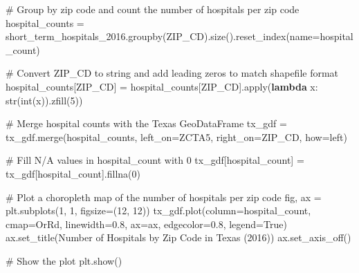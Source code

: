 \documentclass[
  letterpaper,
  DIV=11,
  numbers=noendperiod]{scrartcl}
\newenvironment{Shaded}{\begin{snugshade}}{\end{snugshade}}
\newcommand{\BuiltInTok}[1]{\textcolor[rgb]{0.00,0.23,0.31}{#1}}
\newcommand{\CommentTok}[1]{\textcolor[rgb]{0.37,0.37,0.37}{#1}}
\newcommand{\DecValTok}[1]{\textcolor[rgb]{0.68,0.00,0.00}{#1}}
\newcommand{\FloatTok}[1]{\textcolor[rgb]{0.68,0.00,0.00}{#1}}
\newcommand{\KeywordTok}[1]{\textcolor[rgb]{0.00,0.23,0.31}{\textbf{#1}}}
\newcommand{\NormalTok}[1]{\textcolor[rgb]{0.00,0.23,0.31}{#1}}
\newcommand{\OperatorTok}[1]{\textcolor[rgb]{0.37,0.37,0.37}{#1}}
\newcommand{\StringTok}[1]{\textcolor[rgb]{0.13,0.47,0.30}{#1}}
\newcommand{\VariableTok}[1]{\textcolor[rgb]{0.07,0.07,0.07}{#1}}
\begin{document}
\begin{Shaded}
\begin{Highlighting}[]
\CommentTok{\# Group by zip code and count the number of hospitals per zip code}
\NormalTok{hospital\_counts }\OperatorTok{=}\NormalTok{ short\_term\_hospitals\_2016.groupby(}\StringTok{\textquotesingle{}ZIP\_CD\textquotesingle{}}\NormalTok{).size().reset\_index(name}\OperatorTok{=}\StringTok{\textquotesingle{}hospital\_count\textquotesingle{}}\NormalTok{)}

\CommentTok{\# Convert ZIP\_CD to string and add leading zeros to match shapefile format}
\NormalTok{hospital\_counts[}\StringTok{\textquotesingle{}ZIP\_CD\textquotesingle{}}\NormalTok{] }\OperatorTok{=}\NormalTok{ hospital\_counts[}\StringTok{\textquotesingle{}ZIP\_CD\textquotesingle{}}\NormalTok{].}\BuiltInTok{apply}\NormalTok{(}\KeywordTok{lambda}\NormalTok{ x: }\BuiltInTok{str}\NormalTok{(}\BuiltInTok{int}\NormalTok{(x)).zfill(}\DecValTok{5}\NormalTok{))}

\CommentTok{\# Merge hospital counts with the Texas GeoDataFrame}
\NormalTok{tx\_gdf }\OperatorTok{=}\NormalTok{ tx\_gdf.merge(hospital\_counts, left\_on}\OperatorTok{=}\StringTok{\textquotesingle{}ZCTA5\textquotesingle{}}\NormalTok{, right\_on}\OperatorTok{=}\StringTok{\textquotesingle{}ZIP\_CD\textquotesingle{}}\NormalTok{, how}\OperatorTok{=}\StringTok{\textquotesingle{}left\textquotesingle{}}\NormalTok{)}

\CommentTok{\# Fill N/A values in \textquotesingle{}hospital\_count\textquotesingle{} with 0}
\NormalTok{tx\_gdf[}\StringTok{\textquotesingle{}hospital\_count\textquotesingle{}}\NormalTok{] }\OperatorTok{=}\NormalTok{ tx\_gdf[}\StringTok{\textquotesingle{}hospital\_count\textquotesingle{}}\NormalTok{].fillna(}\DecValTok{0}\NormalTok{)}

\CommentTok{\# Plot a choropleth map of the number of hospitals per zip code}
\NormalTok{fig, ax }\OperatorTok{=}\NormalTok{ plt.subplots(}\DecValTok{1}\NormalTok{, }\DecValTok{1}\NormalTok{, figsize}\OperatorTok{=}\NormalTok{(}\DecValTok{12}\NormalTok{, }\DecValTok{12}\NormalTok{))}
\NormalTok{tx\_gdf.plot(column}\OperatorTok{=}\StringTok{\textquotesingle{}hospital\_count\textquotesingle{}}\NormalTok{, cmap}\OperatorTok{=}\StringTok{\textquotesingle{}OrRd\textquotesingle{}}\NormalTok{, linewidth}\OperatorTok{=}\FloatTok{0.8}\NormalTok{, ax}\OperatorTok{=}\NormalTok{ax, edgecolor}\OperatorTok{=}\StringTok{\textquotesingle{}0.8\textquotesingle{}}\NormalTok{, legend}\OperatorTok{=}\VariableTok{True}\NormalTok{)}
\NormalTok{ax.set\_title(}\StringTok{\textquotesingle{}Number of Hospitals by Zip Code in Texas (2016)\textquotesingle{}}\NormalTok{)}
\NormalTok{ax.set\_axis\_off()}

\CommentTok{\# Show the plot}
\NormalTok{plt.show()}
\end{Highlighting}
\end{Shaded}
\end{document}
